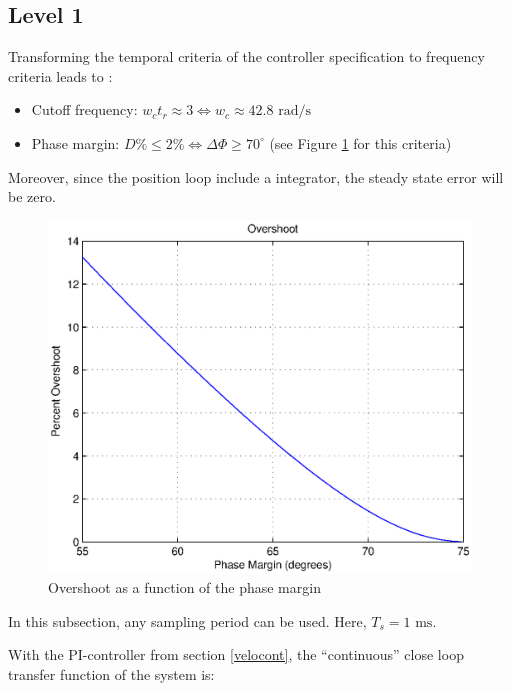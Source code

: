 \subsection*{Level 1}


Transforming the temporal criteria of the controller specification to frequency criteria leads to :
\begin{itemize}
 \item Cutoff frequency: $w_c t_r \approx 3 \Leftrightarrow w_c \approx 42.8 \text{ rad/s}$
 \item Phase margin: $D\% \leq 2\% \Leftrightarrow \Delta \Phi \geq 70^{\circ}$ (see Figure \ref{overshootMargin} for this criteria)
\end{itemize}

Moreover, since the position loop include a integrator, the steady state error will be zero.

\begin{center}
\begin{figure}[Ht]
 \includegraphics[width=\linewidth]{fig/overshootMargin.eps}
 \caption{Overshoot as a function of the phase margin}
 \label{overshootMargin}
\end{figure}
\end{center}

In this subsection, any sampling period can be used. Here, $T_s = 1 \text{ ms}$.

With the PI-controller from section \ref{velocont}, the ``continuous'' close loop transfer function of the system is:

